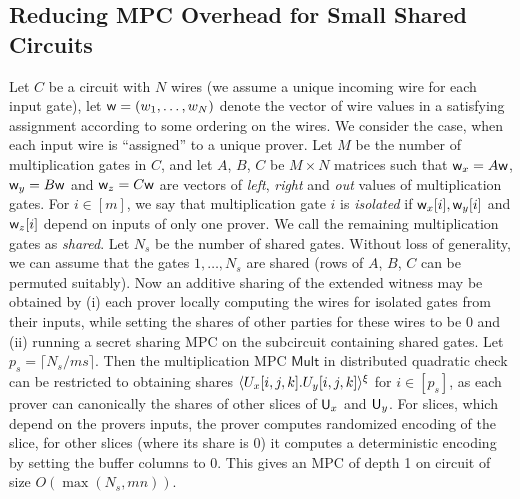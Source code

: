 \subsection{Reducing MPC Overhead for Small Shared Circuits}\label{sec:sharedcircuitopti}
Let $C$ be a circuit with $N$ wires (we assume a unique incoming wire for each
input gate), let $\mathsf{w}=(w_1,\ldots,w_N)$ denote the vector of wire values in a
satisfying assignment according to some ordering on the wires. We consider the
case, when each input wire is ``assigned'' to a unique prover. Let $M$ be the
number of multiplication gates in $C$, and let $A$, $B$, $C$ 
 be $M\times N$ matrices such that $\mathsf{w}_x=A\mathsf{w}$, $\mathsf{w}_y=B\mathsf{w}$
and $\mathsf{w}_z=C\mathsf{w}$ are vectors of {\em left}, {\em right} and {\em out} values
of multiplication gates. For $i\in [m]$, we say that multiplication gate $i$ is
{\em isolated} if $\mathsf{w}_x[i],\mathsf{w}_y[i]$ and $\mathsf{w}_z[i]$ depend on inputs of only
one prover. We call the remaining multiplication gates as {\em shared}. Let
$N_s$ be the number of shared gates. Without loss of generality, we can assume
that the gates $1,\ldots,N_s$ are shared (rows of  $A$, $B$, $C$ can be permuted
suitably). Now an additive sharing of the extended witness may be obtained by
(i) each prover locally computing the wires for isolated gates from their
inputs, while setting the shares of other parties for these wires to be $0$ and
(ii) running a secret sharing MPC on the subcircuit containing shared gates.
Let $p_s=\lceil N_s/ms \rceil$. Then the multiplication MPC $\mathsf{Mult}$ in
distributed quadratic check can be restricted to obtaining shares
$\langle{U_x[i,j,k].U_y[i,j,k]}\rangle^\xi$ for $i\in [p_s]$, as each prover can canonically 
the shares of other slices of $\mathsf{U}_x$ and $\mathsf{U}_y$. For slices, which depend
on the provers inputs, the prover computes randomized encoding of the slice, for
other slices (where its share is $0$) it computes a deterministic encoding by
setting the buffer columns to $0$. This gives an MPC of depth 1 on circuit of
size $O(\max(N_s, mn))$.